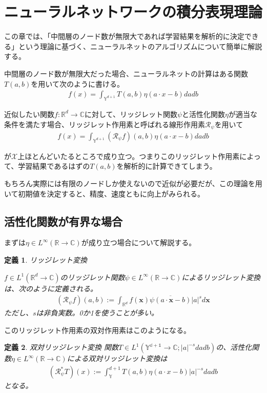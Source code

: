 \documentclass[dvipdfmx, a4paper]{jsarticle}
\newtheorem{defi}{定義}[section]
\begin{document}
\newpage
\section{ニューラルネットワークの積分表現理論}
この章では、「中間層のノード数が無限大であれば学習結果を解析的に決定できる」という理論に基づく、ニューラルネットのアルゴリズムについて簡単に解説する。

中間層のノード数が無限大だった場合、ニューラルネットの計算はある関数$T(a,b)$を用いて次のように書ける。
\begin{align}
f(x)=\int_{\mathbb{Y}^{d+1}}T(a,b)\eta(a\cdot x-b)dadb 
\end{align}

近似したい関数$f:\mathbb{R}^d\to\mathbb{C}$に対して、リッジレット関数$\psi$と活性化関数$\eta$が適当な条件を満たす場合、リッジレット作用素と呼ばれる線形作用素$\mathcal{R}_\psi$を用いて
\begin{align}
f(x)=\int_{\mathbb{Y}^{d+1}}(\mathcal{R}_\psi f)(a,b)\eta(a\cdot x-b)dadb
\end{align}

が$\mathcal{X}$上ほとんどいたるところで成り立つ。つまりこのリッジレット作用素によって、学習結果であるはずの$T(a,b)$を解析的に計算できてしまう。

もちろん実際には有限のノードしか使えないので近似が必要だが、この理論を用いて初期値を決定すると、精度、速度ともに向上がみられる。

\subsection{活性化関数が有界な場合}
まずは$\eta\in L^\infty(\mathbb{R}\to\mathbb{C})$が成り立つ場合について解説する。

\begin{defi}リッジレット変換

$f\in L^1(\mathbb{R}^d\to\mathbb{C})$のリッジレット関数$\psi\in L^\infty(\mathbb{R}\rightarrow\mathbb{C})$によるリッジレット変換は、次のように定義される。
\begin{align}
(\mathcal{R}_\psi f)(a,b):=\int_{\mathbb{R}^{d}}f(\bm{x})\overline{\psi(a\cdot\bm{x}-b)}|a|^sd\bm{x}
\end{align}
ただし、$s$は非負実数。0か1を使うことが多い。
\end{defi}

このリッジレット作用素の双対作用素はこのようになる。

\begin{defi}双対リッジレット変換
関数$T\in L^1(\mathbb{{Y}^{d+1}}\rightarrow\mathbb{C};|a|^{-s}dadb)$の、活性化関数$\eta\in L^\infty(\mathbb{R}\rightarrow\mathbb{C})$による双対リッジレット変換は
\begin{align}
(\mathcal{R}^*_\psi T)(x):=\int_\mathbb{Y}^{d+1}T(a,b)\eta(a\cdot x-b)|a|^{-s}dadb
\end{align}
となる。
\end{defi}
\end{document}
